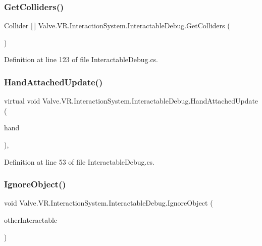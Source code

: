 \subsubsection{\texorpdfstring{GetColliders()}{GetColliders()}}
{\footnotesize\ttfamily Collider \mbox{[}$\,$\mbox{]} Valve.\+V\+R.\+Interaction\+System.\+Interactable\+Debug.\+Get\+Colliders (\begin{DoxyParamCaption}{ }\end{DoxyParamCaption})}



Definition at line 123 of file Interactable\+Debug.\+cs.

\mbox{\label{class_valve_1_1_v_r_1_1_interaction_system_1_1_interactable_debug_aa7b98fc955bae608d9563d305212ee62}} 
\subsubsection{\texorpdfstring{HandAttachedUpdate()}{HandAttachedUpdate()}}
{\footnotesize\ttfamily virtual void Valve.\+V\+R.\+Interaction\+System.\+Interactable\+Debug.\+Hand\+Attached\+Update (\begin{DoxyParamCaption}\item[{\mbox{\hyperlink{class_valve_1_1_v_r_1_1_interaction_system_1_1_hand}{Hand}}}]{hand }\end{DoxyParamCaption})\hspace{0.3cm}{\ttfamily [protected]}, {\ttfamily [virtual]}}



Definition at line 53 of file Interactable\+Debug.\+cs.

\mbox{\label{class_valve_1_1_v_r_1_1_interaction_system_1_1_interactable_debug_a76540719a87638bb596e44730f48ea1b}} 
\subsubsection{\texorpdfstring{IgnoreObject()}{IgnoreObject()}}
{\footnotesize\ttfamily void Valve.\+V\+R.\+Interaction\+System.\+Interactable\+Debug.\+Ignore\+Object (\begin{DoxyParamCaption}\item[{\mbox{\hyperlink{class_valve_1_1_v_r_1_1_interaction_system_1_1_interactable_debug}{Interactable\+Debug}}}]{other\+Interactable }\end{DoxyParamCaption})}



